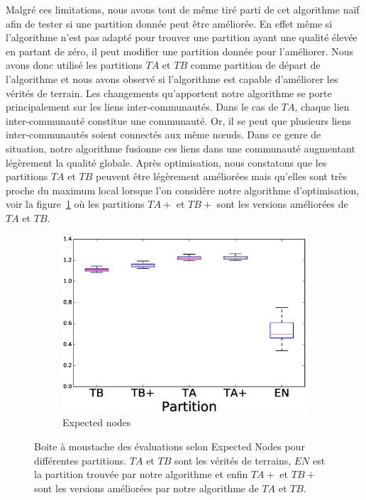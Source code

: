 Malgré ces limitations, nous avons tout de même tiré parti de cet algorithme naïf afin de tester si une partition donnée peut être améliorée.
En effet même si l'algorithme n'est pas adapté pour trouver une partition ayant une qualité élevée en partant de zéro, il peut modifier une partition donnée pour l'améliorer. 
Nous avons donc utilisé les partitions $TA$ et $TB$ comme partition de départ de l'algorithme et nous avons observé si l'algorithme est capable d'améliorer les vérités de terrain.
Les changements qu'apportent notre algorithme se porte principalement sur les liens inter-communautés.
Dans le cas de $TA$, chaque lien inter-communauté constitue une communauté.
Or, il se peut que plusieurs liens inter-communautés soient connectés aux même n\oe uds.
Dans ce genre de situation, notre algorithme fusionne ces liens dans une communauté augmentant légèrement la qualité globale.
Après optimisation, nous constatons que les partitions $TA$ et $TB$ peuvent être légèrement améliorées mais qu'elles sont très proche du maximum local lorsque l'on considère notre algorithme d'optimisation,
voir la figure~\ref{fig:LFEN} où les partitions $TA+$ et $TB+$ sont les versions améliorées de $TA$ et $TB$.
\begin{figure}
\centering
	\begin{subfigure}{0.31\textwidth}
		\includegraphics[width=\linewidth]{img/ExpectedNodes/LF/LFR1_Modified_ALL.eps}
		\caption{\label{fig:LFEN}Expected nodes}		
	\end{subfigure}
	
	\caption{Boite à moustache des évaluations selon Expected Nodes pour différentes partitions.
	$TA$ et $TB$ sont les vérités de terrains, $EN$ est la partition trouvée par notre algorithme et enfin $TA+$ et $TB+$ sont les versions améliorées par notre algorithme de $TA$ et $TB$.
	}
	\label{fig:LF_bis_EN}
\end{figure}

